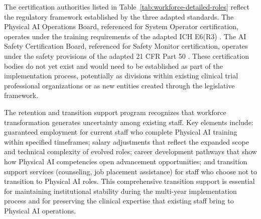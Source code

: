 The certification authorities listed in Table~\ref{tab:workforce-detailed-roles}
reflect the regulatory framework established by the three adapted standards.
The Physical AI Operations Board, referenced for System Operator certification,
operates under the training requirements of the adapted ICH E6(R3)
\cite{ich-adapt}. The AI Safety Certification Board, referenced for Safety
Monitor certification, operates under the safety provisions of the adapted
21 CFR Part 50 \cite{cfr50-adapt}. These certification bodies do not yet
exist and would need to be established as part of the implementation process,
potentially as divisions within existing clinical trial professional
organizations or as new entities created through the legislative framework.

The retention and transition support program recognizes that workforce
transformation generates uncertainty among existing staff. Key elements
include: guaranteed employment for current staff who complete Physical AI
training within specified timeframes; salary adjustments that reflect the
expanded scope and technical complexity of evolved roles; career development
pathways that show how Physical AI competencies open advancement
opportunities; and transition support services (counseling, job placement
assistance) for staff who choose not to transition to Physical AI roles.
This comprehensive transition support is essential for maintaining
institutional stability during the multi-year implementation process and
for preserving the clinical expertise that existing staff bring to Physical
AI operations.
